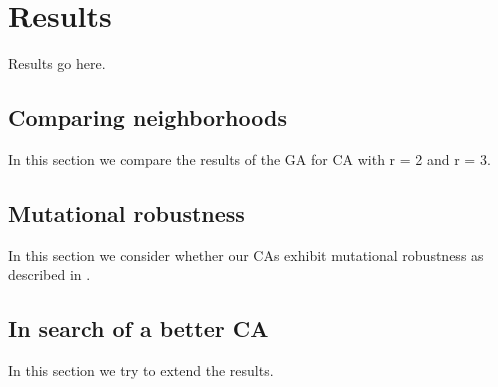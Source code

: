 \section{Results} \label{results}

Results go here.

\subsection{Comparing neighborhoods} \label{sec:2_1}

In this section we compare the results of the GA for CA with r = 2 and r = 3.

\subsection{Mutational robustness} \label{sec:2_2}

In this section we consider whether our CAs exhibit mutational robustness as described in \cite{wagner_role_2012}.

\subsection{In search of a better CA} \label{sec:2_3}

In this section we try to extend the results.



